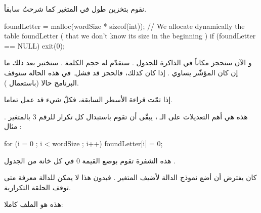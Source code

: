 نقوم بتخزين طول
في المتغير
كما شرحتُ سابقاً.

\begin{Csource}
foundLetter = malloc(wordSize  * sizeof(int)); // We allocate dynamically the table foundLetter ( that we don’t know its size in the beginning )
if (foundLetter  == NULL)
	 exit(0);
\end{Csource}

و الآن سنحجز مكاناً في الذاكرة للجدول
.
سنقدّم له حجم الكلمة
.
سنختبر بعد ذلك ما إن كان المؤشّر يساوي
.
إذا كان كذلك، فالحجز قد فشل. في هذه الحالة سنوقف البرنامج حالا (باستعمال
).

إذا تمّت قراءة الأسطر السابقة، فكلّ شيء قد عمل تماما.

هذه هي أهم التعديلات على الـ
،
يبقّى أن تقوم باستبدال كل تكرار للرقم 3 بالمتغير
.
مثال :

\begin{Csource}
  for (i = 0 ; i < wordSize ; i++)
  	foundLetter[i] = 0;
\end{Csource}

هذه الشفرة تقوم بوضع القيمة 0 في كل خانة من الجدول
.

كان يفترض أن أضع نموذج الدالة
لأضيف المتغير
.
فبدون هذا لا يمكن للدالة معرفة متى توقف الحلقة التكرارية.

هذه هو الملف
كاملا:

